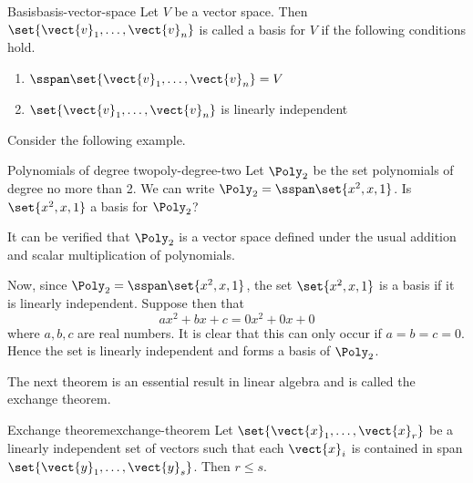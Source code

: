 \begin{definition}{Basis}{basis-vector-space}
Let $V$ be a vector space. Then $\set{\vect{v}_{1},\ldots,\vect{v}_{n}}$ is called a basis for $V$ if the following conditions hold.
\begin{enumerate}
\item
$\sspan\set{\vect{v}_{1},\ldots,\vect{v}_{n}} = V$
\item
$\set{\vect{v}_{1},\ldots,\vect{v}_{n}}$ is linearly independent
\end{enumerate}
\end{definition}

Consider the following example.

\begin{example}{Polynomials of degree two}{poly-degree-two}
Let $\Poly_2$ be the set polynomials of degree no more than 2. We can write
$\Poly_2=\sspan\set{x^{2}, x, 1}$. Is $\set{x^{2}, x, 1} $ a
basis for $\Poly_2$?
\end{example}

\begin{solution}
It can be verified that $\Poly_2$ is a vector space defined under the usual addition and scalar multiplication of polynomials. 

Now, since $\Poly_2=\sspan\set{x^{2},x, 1}$, the set  $\set{x^{2}, x, 1} $ is a basis if it is linearly independent. Suppose then that 
\begin{equation*}
ax^{2}+bx+c=0x^2 + 0x + 0 
\end{equation*}
where $a,b,c$ are real numbers. It is clear that this can only occur if $a=b=c=0$. Hence the set is linearly independent and forms a basis of $\Poly_2$.
\end{solution}

The next theorem is an essential result in linear algebra and is called the exchange theorem.

\begin{theorem}{Exchange theorem}{exchange-theorem}
Let $\set{\vect{x}_{1},\ldots,\vect{x}_{r}} $
be a linearly independent set of vectors such that each $\vect{x}_{i}$ is
contained in span$\set{\vect{y}_{1},\ldots,\vect{y}_{s}}$. Then $
r\leq s$.
\end{theorem}

